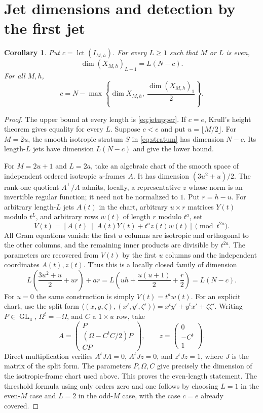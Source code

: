\documentclass[11pt]{article}
\numberwithin{equation}{section}
\newtheorem{corollary}[theorem]{Corollary}
\theoremstyle{remark}
\newcommand{\lct}{\operatorname{lct}}
\begin{document}
\section{Jet dimensions and detection by the first jet}
\begin{corollary}\label{cor:evenjets}
Put $c=\lct(I_{M,h})$. For every $L\ge1$ such that $M$ or $L$
is even,
\[
 \dim(X_{M,h})_{L-1}=L(N-c).
\]
For all $M,h$,
\[
 c=N-\max\left\{\dim X_{M,h},\
                    \frac{\dim(X_{M,h})_1}{2}\right\}.
\]
\end{corollary}
\begin{proof}
The upper bound at every length is \eqref{eq:jetupper}.
If $c=e$, Krull's height theorem gives equality for every $L$.
Suppose $c<e$ and put $u=\lfloor M/2\rfloor$.
For $M=2u$, the smooth isotropic stratum $S$ in
\eqref{eq:stratum} has dimension $N-c$. Its length-$L$
jets have dimension $L(N-c)$ and give the lower bound.

For $M=2u+1$ and $L=2a$, take an algebraic chart of the smooth
space of independent ordered isotropic $u$-frames $A$.
It has dimension $(3u^2+u)/2$. The rank-one quotient
$A^\perp/A$ admits, locally, a representative $z$ whose norm
is an invertible regular function; it need not be normalized to $1$.
Put $r=h-u$. For arbitrary length-$L$ jets $A(t)$ in the
chart, arbitrary $u\times r$ matrices $Y(t)$ modulo $t^L$,
and arbitrary rows $w(t)$ of length $r$ modulo $t^a$, set
\[
 V(t)=\left[A(t)\ \middle|\ A(t)Y(t)+t^az(t)w(t)\right]
                          \pmod {t^{2a}}.
\]
All Gram equations vanish: the first $u$ columns are isotropic
and orthogonal to the other columns, and the remaining
inner products are divisible by $t^{2a}$.
The parameters are recovered from $V(t)$ by the first
$u$ columns and the independent coordinates $A(t),z(t)$.
Thus this is a locally closed family of dimension
\[
 L\left(\frac{3u^2+u}{2}+ur\right)+ar
   =L\left(uh+\frac{u(u+1)}2+\frac r2\right)
   =L(N-c).
\]
For $u=0$ the same construction is simply $V(t)=t^aw(t)$.
For an explicit chart, use the split form
$\langle(x,y,\zeta),(x',y',\zeta')\rangle=x^ty'+y^tx'+\zeta\zeta'$.
Writing $P\in\operatorname{GL}_u$, $\Omega ^t=-\Omega $, and $C$ a
$1\times u$ row, take
\[
 A=\begin{pmatrix}P\\(\Omega -C^tC/2)P\\CP\end{pmatrix},
 \qquad z=\begin{pmatrix}0\\-C^t\\1\end{pmatrix}.
\]
Direct multiplication verifies $A^tJA=0$, $A^tJz=0$,
and $z^tJz=1$, where $J$ is the matrix of the split form.
The parameters $P,\Omega ,C$ give precisely the dimension of
the isotropic-frame chart used above.
This proves the even-length statement. The threshold formula
using only orders zero and one follows by choosing $L=1$
in the even-$M$ case and $L=2$ in the odd-$M$ case, with
the case $c=e$ already covered.
\end{proof}
\end{document}
